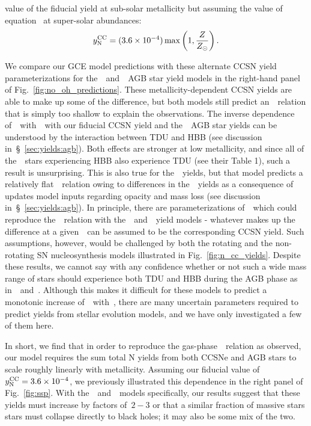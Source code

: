 \documentclass[ms.tex]{subfiles}
\begin{document}
value of the fiducial yield at sub-solar metallicity but assuming the value of
equation~ at super-solar abundances:
\begin{equation}
y_\text{N}^\text{CC} = (3.6\times10^{-4})\max\left(1, \frac{Z}{Z_\odot}\right).
\label{eq:broken_yncc}
\end{equation}
\par
We compare our GCE model predictions with these alternate CCSN yield
parameterizations for the~\karakasten~and~\karakas~AGB star yield models in
the right-hand panel of Fig.~\ref{fig:no_oh_predictions}.
These metallicity-dependent CCSN yields are able to make up some of the
difference, but both models still predict an~\ohno~relation that is simply
too shallow to explain the observations.
The inverse dependence of~\no~with~\oh~with our fiducial CCSN yield and
the~\karakasten~AGB star yields can be understood by the interaction between
TDU and HBB (see discussion in~\S~\ref{sec:yields:agb}).
Both effects are stronger at low metallicity, and since all of
the~\karakasten~stars experiencing HBB also experience TDU (see their Table 1),
such a result is unsurprising.
This is also true for the~\karakas~yields, but that model predicts a relatively
flat~\ohno~relation owing to differences in the~\Nfourteen~yields as a
consequence of updates model inputs regarding opacity and mass loss (see
discussion in~\S~\ref{sec:yields:agb}).
In principle, there are parameterizations of~~which could reproduce
the~\ohno~relation with the~\karakasten~and~\karakas~yield models - whatever
makes up the difference at a given~\oh~can be assumed to be the corresponding
CCSN yield.
Such assumptions, however, would be challenged by both the rotating and the
non-rotating SN nucleosynthesis models illustrated in
Fig.~\ref{fig:n_cc_yields}.
Despite these results, we cannot say with any confidence whether or not such
a wide mass range of stars should experience both TDU and HBB during the AGB
phase as in~\karakasten~and~\karakas.
Although this makes it difficult for these models to predict a monotonic
increase of~\no~with~\oh, there are many uncertain parameters required to
predict yields from stellar evolution models, and we have only investigated a
few of them here.
\par
In short, we find that in order to reproduce the gas-phase~\ohno~relation as
observed, our model requires the sum total N yields from both CCSNe and AGB
stars to scale roughly linearly with metallicity.
Assuming our fiducial value of~$y_\text{N}^\text{CC} = 3.6\times10^{-4}$, we previously
illustrated this dependence in the right panel of Fig.~\ref{fig:ssp}.
With the~\cristallo~and~\ventura~models specifically, our results suggest that
these yields must increase by factors of~$2 - 3$ or that a similar fraction of
massive stars stars must collapse directly to black holes; it may also be some
mix of the two.
\end{document}
